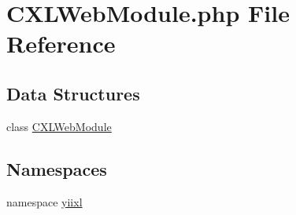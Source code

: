 \hypertarget{CXLWebModule_8php}{
\section{CXLWebModule.php File Reference}
\label{CXLWebModule_8php}
}
\subsection*{Data Structures}
\begin{DoxyCompactItemize}
\item 
class \hyperlink{classCXLWebModule}{CXLWebModule}
\end{DoxyCompactItemize}
\subsection*{Namespaces}
\begin{DoxyCompactItemize}
\item 
namespace \hyperlink{namespaceyiixl}{yiixl}
\end{DoxyCompactItemize}
